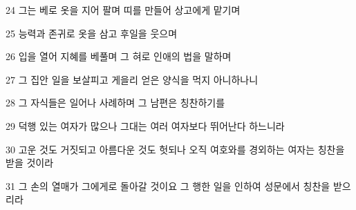 \par 24 그는 베로 옷을 지어 팔며 띠를 만들어 상고에게 맡기며
\par 25 능력과 존귀로 옷을 삼고 후일을 웃으며
\par 26 입을 열어 지혜를 베풀며 그 혀로 인애의 법을 말하며
\par 27 그 집안 일을 보살피고 게을리 얻은 양식을 먹지 아니하나니
\par 28 그 자식들은 일어나 사례하며 그 남편은 칭찬하기를
\par 29 덕행 있는 여자가 많으나 그대는 여러 여자보다 뛰어난다 하느니라
\par 30 고운 것도 거짓되고 아름다운 것도 헛되나 오직 여호와를 경외하는 여자는 칭찬을 받을 것이라
\par 31 그 손의 열매가 그에게로 돌아갈 것이요 그 행한 일을 인하여 성문에서 칭찬을 받으리라


